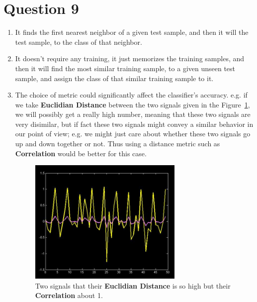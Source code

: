 \documentclass[a4paper,12pt]{article}
\begin{document}
\section*{Question 9}
\begin{enumerate}[label=(\alph*)]
    \item It finds the first nearest neighbor of a given test sample, and then it will the test sample, to the class of that neighbor.
    \item It doesn't require any training, it just memorizes the training samples, and then it will find the most similar training sample, to a given unseen test sample, and assign the class of that similar training sample to it.
    \item The choice of metric could significantly affect the classifier's accuracy. e.g. if we take \textbf{Euclidian Distance} between the two signals given in the Figure~\ref{fig:fig_2}, we will possibly get a really high number, meaning that these two signals are very disimilar, but if fact these two signals might convey a similar behavior in our point of view; e.g. we might just care about whether these two signals go up and down together or not. Thus using a distance metric such as \textbf{Correlation} would be better for this case.
    \begin{figure}[H]
        \centering
        \includegraphics[width=0.7\textwidth]{../images/metric_for_classifier.png}
        \caption{Two signals that their \textbf{Euclidian Distance} is so high but their \textbf{Correlation} about 1.}
        \label{fig:fig_2}
    \end{figure}
\end{enumerate}
\end{document}
